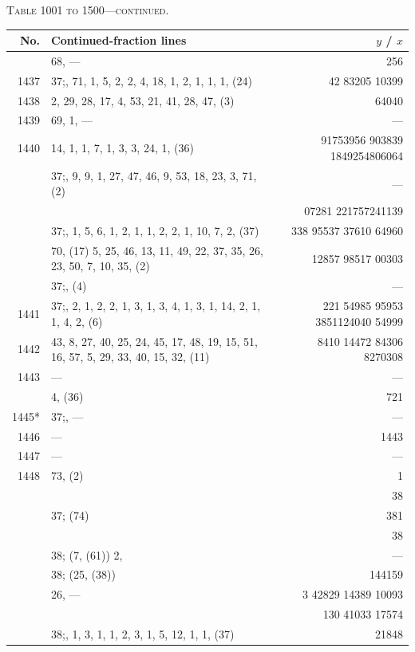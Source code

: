 \documentclass[11pt]{article}
\newcommand{\peheading}{%
  \begin{center}\small\textsc{Table 1001 to 1500---continued.}\end{center}
}
\begin{document}
\peheading
\renewcommand{\arraystretch}{1.15}
{\footnotesize
\begin{longtable}{|r|p{8.5cm}|r|}
\hline
\textbf{No.} & \textbf{Continued-fraction lines} & \textbf{$y$ \;/\; $x$}\\
\hline\endhead
       & 68, --- & 256 \\
\hline
1437   & $37$;\; 1, 71, 1, 5, 2, 2, 4, 18, 1, 2, 1, 1, 1, (24) & 42 83205 10399 \\
1438   & 2, 29, 28, 17, 4, 53, 21, 41, 28, 47, (3) & 64040 \\
1439   & 69, 1, --- & --- \\
1440   & 14, 1, 1, 7, 1, 3, 3, 24, 1, (36) & 91753956 903839 1849254806064 \\
       & $37$;\; 1, 9, 9, 1, 27, 47, 46, 9, 53, 18, 23, 3, 71, (2) & --- \\
       & & 07281 221757241139 \\
       & $37$;\; 2, 1, 5, 6, 1, 2, 1, 1, 2, 2, 1, 10, 7, 2, (37) & 338 95537 37610 64960 \\
       & 70, (17) 5, 25, 46, 13, 11, 49, 22, 37, 35, 26, 23, 50, 7, 10, 35, (2) & 12857 98517 00303 \\
\hline
       & $37$;\; 1, (4) & --- \\
\hline
1441   & $37$;\; 9, 2, 1, 2, 2, 1, 3, 1, 3, 4, 1, 3, 1, 14, 2, 1, 1, 4, 2, (6) & 221 54985 95953 3851124040 54999 \\
1442   & 43, 8, 27, 40, 25, 24, 45, 17, 48, 19, 15, 51, 16, 57, 5, 29, 33, 40, 15, 32, (11) & 8410 14472 84306 8270308 \\
1443   & --- & --- \\
       & 4, (36) & 721 \\
1445*  & $37$;\; 1, --- & --- \\
1446   & --- & 1443 \\
1447   & --- & --- \\
1448   & 73, (2) & 1 \\
       & & 38 \\
       & $37$;\; (74) & 381 \\
       & & 38 \\
\hline
       & $38$;\; (7, (61)) 2, & --- \\
\hline
       & $38$;\; (25, (38)) & 144159 \\
       & 26, --- & 3 42829 14389 10093 \\
       & & 130 41033 17574 \\
       & $38$;\; 7, 1, 3, 1, 1, 2, 3, 1, 5, 12, 1, 1, (37) & 21848 \\

\end{longtable}}
\end{document}
